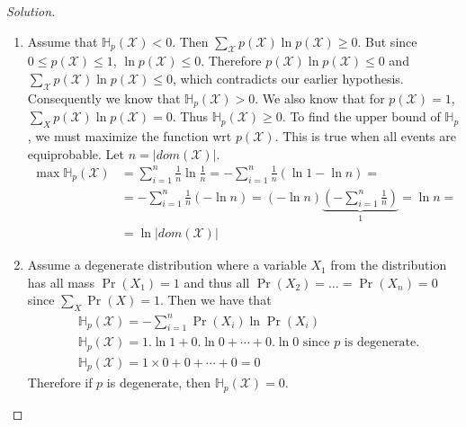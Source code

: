 \documentclass{amsart}
\theoremstyle{plain}
\newenvironment{solution}{\begin{proof}[Solution]}{\end{proof}}
\newcommand{\set}[1]{\mathcal{#1}}
\newcommand{\entropy}{\mathbb{H}_p}
\begin{document}
\begin{solution}~\\
  \begin{enumerate}[label=(\roman*)]
    \item Assume that $\entropy(\set{X})<0$. Then $\sum_{\set{X}} p(\set{X})\ln p(\set{X})\geq 0$.
      But since $0\leq p(\set{X})\leq 1$, $\ln p(\set{X})\leq 0$. Therefore $p(\set{X})\ln
      p(\set{X})\leq 0$ and $\sum_{\set{X}} p(\set{X})\ln p(\set{X})\leq 0$, which contradicts our
      earlier hypothesis. Consequently we know that $\entropy(\set{X})>0$. We also know that for
      $p(\set{X})=1$, $\sum_X p(\set{X})\ln p(\set{X})=0$. Thus $\entropy(\set{X})\geq 0$. To find
      the upper bound of $\entropy$, we must maximize the function wrt $p(\set{X})$. This is true
      when all events are equiprobable. Let $n=|dom(\set{X})|$.
      \begin{align*}
        \max \entropy(\set{X}) &= \sum_{i=1}^n \frac{1}{n} \ln \frac{1}{n} =
            -\sum_{i=1}^n \frac{1}{n} (\ln 1 - \ln n) =\\
          &=-\sum_{i=1}^n \frac{1}{n}(-\ln n) =
            (-\ln n)\underbrace{\left ( -\sum_{i=1}^n \frac{1}{n}\right )}_1 = \ln n =\\
          &=\ln |dom(\set{X})|
      \end{align*}
    \item Assume a degenerate distribution where a variable $X_1$ from the distribution has all
      mass $\Pr(X_1)=1$ and thus all $\Pr(X_2)=\ldots=\Pr(X_n)=0$ since $\sum_X \Pr(X)=1$. Then we
      have that
      \begin{align*}
        &\entropy(\set{X})=-\sum_{i=1}^n \Pr(X_i)\ln\Pr(X_i)\\
        &\entropy(\set{X})=1.\ln 1 + 0.\ln 0 + \cdots + 0.\ln 0\text{~since $p$ is degenerate.}\\
        &\entropy(\set{X})=1\times 0 + 0 + \cdots + 0 = 0
      \end{align*}
      Therefore if $p$ is degenerate, then $\entropy(\set{X})=0$.


\end{enumerate}
\end{solution}
\end{document}
